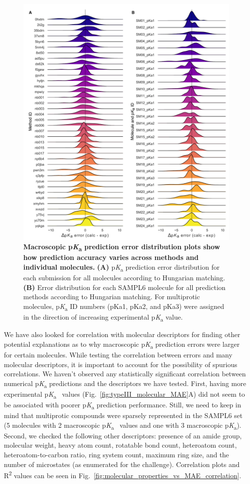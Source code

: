 \documentclass[9pt,lineno,final]{elife}
\newcommand{\pKa}{p\textit{K}\textsubscript{a}}
\begin{document}
\begin{figure}
\centering
\includegraphics[width=0.8\linewidth]{figures/typeIII-error-distribution.pdf}
\caption{{\bf Macroscopic \pKa{} prediction error distribution plots show how prediction accuracy varies across methods and individual molecules.}
{\bf(A)} \pKa{} prediction error distribution for each submission for all molecules according to Hungarian matching. 
{\bf(B)} Error distribution for each SAMPL6 molecule for all prediction methods according to Hungarian matching. For multiprotic molecules, \pKa{} ID numbers (pKa1, pKa2, and pKa3) were assigned in the direction of increasing experimental \pKa{} value. 
}
\label{fig:typeIII-error-distribution}
\end{figure}

We have also looked for correlation with molecular descriptors for finding other potential explanations as to why macroscopic \pKa{} prediction errors were larger for certain molecules. 
While testing the correlation between errors and many molecular descriptors, it is important to account for the possibility of spurious correlations. 
We haven't observed any statistically significant correlation between numerical \pKa{} predictions and the descriptors we have tested. 
First, having more experimental \pKa{}~ values (Fig.~\ref{fig:typeIII_molecular_MAE}A) did not seem to be associated with poorer \pKa{} prediction performance. 
Still, we need to keep in mind that multiprotic compounds were sparsely represented in the SAMPL6 set (5 molecules with 2 macroscopic \pKa{}~ values and one with 3 macroscopic \pKa{}).
Second, we checked the following other descriptors: presence of an amide group, molecular weight, heavy atom count, rotatable bond count, heteroatom count, heteroatom-to-carbon ratio, ring system count, maximum ring size, and the number of microstates (as enumerated for the challenge). 
Correlation plots and R\textsuperscript{2} values can be seen in Fig.~\ref{fig:molecular_properties_vs_MAE_correlation}. 
\end{document}
